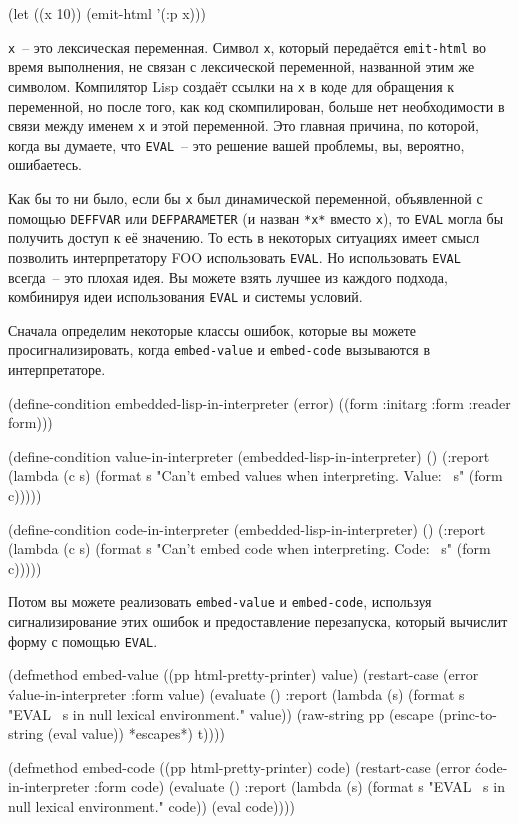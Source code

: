 \begin{myverb}
(let ((x 10)) (emit-html '(:p x)))
\end{myverb}

\noindent{}\lstinline{х}~-- это лексическая переменная. Символ \lstinline{х}, который передаётся
\lstinline{emit-html} во время выполнения, не связан с лексической переменной, названной
этим же символом.  Компилятор Lisp создаёт ссылки на \lstinline{х} в коде для обращения к
переменной, но после того, как код скомпилирован, больше нет необходимости в связи между
именем \lstinline{х} и этой переменной. Это главная причина, по которой, когда вы думаете,
что \lstinline{EVAL}~-- это решение вашей проблемы, вы, вероятно, ошибаетесь.

Как бы то ни было, если бы \lstinline{х} был динамической переменной, объявленной с помощью
\lstinline{DEFFVAR} или \lstinline{DEFPARAMETER} (и назван \lstinline{*х*} вместо \lstinline{х}), то
\lstinline{EVAL} могла бы получить доступ к её значению.  То есть в некоторых ситуациях имеет
смысл позволить интерпретатору FOO использовать \lstinline{EVAL}. Но использовать \lstinline{EVAL}
всегда~-- это плохая идея. Вы можете взять лучшее из каждого подхода, комбинируя идеи
использования \lstinline{EVAL} и системы условий.

Сначала определим некоторые классы ошибок, которые вы можете просигнализировать,
когда \lstinline{embed-value} и \lstinline{embed-code} вызываются в интерпретаторе.

\begin{myverb}
(define-condition embedded-lisp-in-interpreter (error)
  ((form :initarg :form :reader form)))

(define-condition value-in-interpreter (embedded-lisp-in-interpreter) ()
  (:report
   (lambda (c s) 
     (format s "Can't embed values when interpreting. Value: ~s" (form c)))))

(define-condition code-in-interpreter (embedded-lisp-in-interpreter) ()
  (:report
   (lambda (c s) 
     (format s "Can't embed code when interpreting. Code: ~s" (form c)))))
\end{myverb}

Потом вы можете реализовать \lstinline{embed-value} и \lstinline{embed-code}, используя
сигнализирование этих ошибок и предоставление перезапуска, который вычислит форму с
помощью \lstinline{EVAL}.

\begin{myverb}
(defmethod embed-value ((pp html-pretty-printer) value)
  (restart-case (error \'value-in-interpreter :form value)
    (evaluate ()
      :report (lambda (s) (format s "EVAL ~s in null lexical environment." value))
      (raw-string pp (escape (princ-to-string (eval value)) *escapes*) t))))

(defmethod embed-code ((pp html-pretty-printer) code)
  (restart-case (error \'code-in-interpreter :form code)
    (evaluate ()
      :report (lambda (s) (format s "EVAL ~s in null lexical environment." code))
      (eval code))))
\end{myverb}

